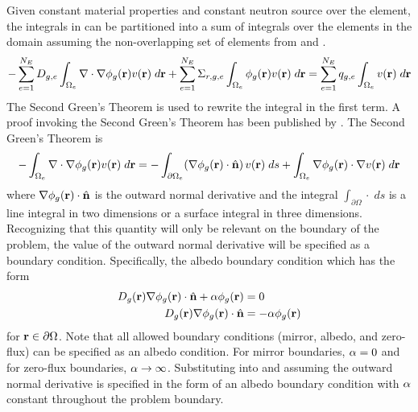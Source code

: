     Given constant material properties and constant neutron source over the
    element, the integrals in  can be partitioned into a
    sum of integrals over the elements in the domain assuming the
    non-overlapping set of elements from  and
    .
    \begin{equation} 
      \label{eq:element_by_element}
      -\sum_{e=1}^{N_E} D_{g,e} 
        \int_{\Omega_e} \mathbf{\nabla} \cdot \mathbf{\nabla} \phi_g(\mathbf{r}) v(\mathbf{r}) \; d\mathbf{r} +
        \sum_{e=1}^{N_E} \Sigma_{r,g,e} \int_{\Omega_e} \phi_g(\mathbf{r}) v(\mathbf{r}) 
        \;d\mathbf{r} = \sum_{e=1}^{N_E} q_{g,e} \int_{\Omega_e} v(\mathbf{r}) 
        \; d\mathbf{r}
    \end{equation}
    The Second Green's Theorem is used to rewrite the integral in the first
    term. A proof invoking the Second Green's Theorem has been published by
    \textcite{textbookli}. %
    The Second Green's Theorem is 
    \begin{equation} 
      \label{eq:greens}
      -\int_{\Omega_e} \mathbf{\nabla} \cdot \mathbf{\nabla} \phi_g(\mathbf{r}) v(\mathbf{r}) \;d\mathbf{r} =
        -\int_{\partial \Omega_e}  
        (\mathbf{\nabla} \phi_g(\mathbf{r}) \cdot \hat{\mathbf{n}}) \, v(\mathbf{r})\; ds +
        \int_{\Omega_e} \mathbf{\nabla} \phi_g(\mathbf{r}) \cdot \mathbf{\nabla} v(\mathbf{r}) \; d\mathbf{r}
    \end{equation}
    where $\mathbf{\nabla} \phi_g(\mathbf{r}) \cdot \hat{\mathbf{n}}$ is the outward normal derivative and
    the integral $\int_{\partial \Omega} {\cdot} \;ds$ is a line integral in two
    dimensions or a surface integral in three dimensions. Recognizing that this
    quantity will only be relevant on the boundary of the problem, the value of
    the outward normal derivative will be specified as a boundary condition.
    Specifically, the albedo boundary condition which has the form 
    \begin{align}
      D_g(\mathbf{r}) \mathbf{\nabla} \phi_g(\mathbf{r}) \cdot \hat{\mathbf{n}} + \alpha \phi_g(\mathbf{r}) &= 0 \\
      D_g(\mathbf{r}) \mathbf{\nabla} \phi_g(\mathbf{r}) \cdot \hat{\mathbf{n}} &= -\alpha \phi_g(\mathbf{r})
    \end{align}
    for $\mathbf{r} \in \partial \Omega$. Note that all allowed boundary conditions
    (mirror, albedo, and zero-flux) can be specified as an albedo condition. For
    mirror boundaries, $\alpha = 0$ and for zero-flux boundaries, $\alpha
    \rightarrow \infty$.  Substituting  into
     and assuming the outward normal derivative is
    specified in the form of an albedo boundary condition with $\alpha$
    constant throughout the problem boundary.
